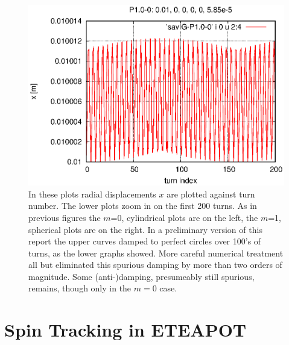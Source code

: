 \documentclass[]{article}
\begin{document}
\begin{figure}[h]
\includegraphics[scale=0.5]{eps/xEvolve0.P1.0-200turn.eps}
\caption{\label{fig:xEvolve0}In these plots radial displacements $x$
are plotted against turn number. The lower plots zoom in on the
first 200 turns. As in previous figures the $m$=0, cylindrical
plots are on the left, the $m$=1, spherical
plots are on the right. In a preliminary version of this report
the upper curves damped to perfect circles over 100's of turns,
as the lower graphs showed. More careful numerical treatment all 
but eliminated this spurious damping by more than two orders
of magnitude. Some (anti-)damping, presumeably still spurious,
remains, though only in the $m=0$ case.
}
\end{figure}
%

\clearpage

\appendix

\section{Spin Tracking in ETEAPOT}
\end{document}
